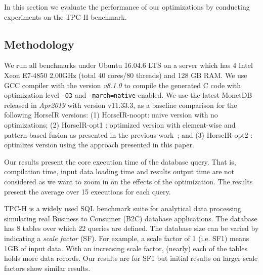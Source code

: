 In this section we evaluate the performance of our optimizations by conducting
experiments on the TPC-H benchmark. 

\subsection{Methodology}

We run all benchmarks under Ubuntu 16.04.6 LTS on a server which has 4 Intel
Xeon E7-4850 2.00GHz (total 40 cores/80 threads) and 128 GB RAM.
We use GCC compiler with the version \textit{v8.1.0} to compile the generated C
code with optimization level \texttt{-O3} and \texttt{-march=native} enabled.
We use the latest MonetDB~\cite{IdreosS2012} released in \textit{Apr2019} with
version v11.33.3, as a baseline comparison for the following HorseIR versions:
(1) HorseIR-noopt: naive version with no optimizations;
(2) HorseIR-opt1 : optimized version with element-wise and pattern-based
fusion as presented in the previous work~\OldPaper; and
(3) HorseIR-opt2 : optimizes version using the approach presented in this paper.

Our results present the core execution time of the database query. That is,
compilation time, input data loading time and results output time are not considered
as we want to zoom in on the effects of the optimization. The results present
the average over 15 executions for each query.


TPC-H \cite{TPCH2017} is a widely used SQL benchmark suite for analytical data
processing simulating real Business to Consumer (B2C) database applications. The 
database has 8 tables over which 22 queries are defined.  The database size can be
varied by indicating a \textit{scale factor} (SF). For example, a scale factor of 1
(i.e. SF1) means 1GB of input data. With an increasing scale factor, (nearly) each
of the tables holds more data records. Our results are for SF1 but initial results
on larger scale factors show similar results.


